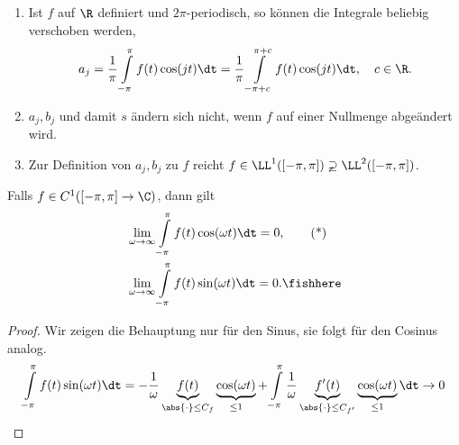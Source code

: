\begin{bem}[Beobachtungen.]
\label{bem:1.49}
\begin{enumerate}[label=\arabic{*}.)]
  \item Ist $f$ auf $\R$ definiert und $2\pi$-periodisch, so können die
  Integrale beliebig verschoben werden,
\begin{align*}
a_j = \frac{1}{\pi}\int\limits_{-\pi}^\pi f(t)\cos(jt)\dt
= \frac{1}{\pi}\int\limits_{-\pi+c}^{\pi+c} f(t)\cos(jt)\dt,\quad c\in\R.
\end{align*}
\item $a_j,b_j$ und damit $s$ ändern sich nicht, wenn $f$ auf einer Nullmenge
abgeändert wird.
\item Zur Definition von $a_j,b_j$ zu $f$ reicht $f\in
\LL^1([-\pi,\pi])\varsupsetneq \LL^2([-\pi,\pi])$.
\end{enumerate}
\end{bem}

\begin{lem}
\label{prop:1.50}
Falls $f\in C^1([-\pi,\pi]\to\C)$, dann gilt
\begin{align*}
&\lim\limits_{\omega\to\infty} \int\limits_{-\pi}^\pi f(t)\cos(\omega t)\dt =
0,\tag{*}\\
&\lim\limits_{\omega\to\infty} \int\limits_{-\pi}^\pi f(t)\sin(\omega t)\dt =
0.\fishhere
\end{align*} 
\end{lem}
\begin{proof}
Wir zeigen die Behauptung nur für den Sinus, sie folgt für den Cosinus analog.
\begin{align*}
\int\limits_{-\pi}^\pi f(t)\sin(\omega t)\dt
= -\frac{1}{\omega}\underbrace{f(t)}_{\abs{\cdot}\le C_f}\underbrace{\cos(\omega
t)}_{\le 1} + \int\limits_{-\pi}^\pi \frac{1}{\omega}
\underbrace{f'(t)}_{\abs{\cdot}\le C_{f'}}\underbrace{\cos(\omega t)}_{\le
1}\dt\to 0\qedhere
\end{align*}
\end{proof}

